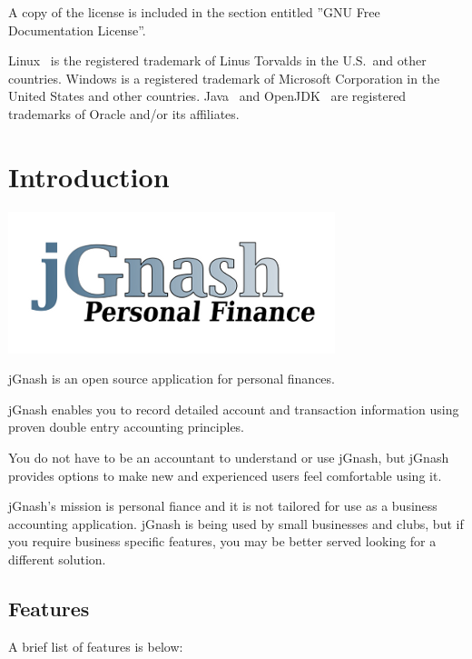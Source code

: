 \documentclass[letterpaper,12pt]{book}
\begin{document}
    A copy of the license is included in the section entitled ''GNU Free Documentation License''.

    Linux\textregistered~ is the registered trademark of Linus Torvalds in the U.S.\ and other countries.
    Windows is a registered trademark of Microsoft Corporation in the United States and other countries.
    Java\texttrademark~ and OpenJDK\texttrademark~ are registered trademarks of Oracle and/or its affiliates.



    \chapter{Introduction}\label{ch:introduction}
    \includegraphics[scale=.6]{images/jgnash-logo-small}

    jGnash is an open source application for personal finances.

    jGnash enables you to record detailed account and transaction information using proven double entry accounting principles.

    You do not have to be an accountant to understand or use jGnash, but jGnash provides options to make new and
    experienced users feel comfortable using it.

    jGnash's mission is personal fiance and it is not tailored for use as a business accounting application.
    jGnash is being used by small businesses and clubs, but if you require business specific features, you may be
    better served looking for a different solution.

    \section{Features}\label{sec:features}
    A brief list of features is below:
\end{document}
